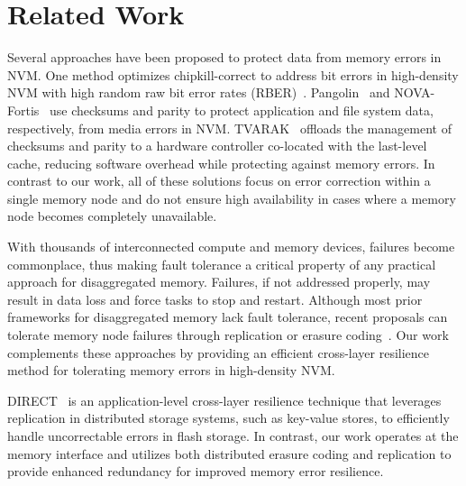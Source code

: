 \section{Related Work}
Several approaches have been proposed to protect data from memory errors in NVM. One method optimizes chipkill-correct to address bit errors in high-density NVM with high random raw bit error rates (RBER)~\cite{zhang:pm-chipkill:micro:2018}. Pangolin~\cite{zhang:pangolin:atc:2019} and NOVA-Fortis~\cite{xu:nova-fortis:sosp:2017} use checksums and parity to protect application and file system data, respectively, from media errors in NVM. TVARAK~\cite{kateja:tvarak:isca:2020} offloads the management of checksums and parity to a hardware controller co-located with the last-level cache, reducing software overhead while protecting against memory errors. In contrast to our work, all of these solutions focus on error correction within a single memory node and do not ensure high availability in cases where a memory node becomes completely unavailable.

With thousands of interconnected compute and memory devices, failures become commonplace, thus making fault tolerance a critical property of any practical approach for disaggregated memory. Failures, if not addressed properly, may result in data loss and force tasks to stop and restart. Although most prior frameworks for disaggregated memory lack fault tolerance, recent proposals can tolerate memory node failures through replication or erasure coding~\cite{zhou:carbink:osdi:2022, lee:hydra:fast:2022}. Our work complements these approaches by providing an efficient cross-layer resilience method for tolerating memory errors in high-density NVM.

DIRECT~\cite{tai:flash-uber:atc:2019} is an application-level cross-layer resilience technique that leverages replication in distributed storage systems, such as key-value stores, to efficiently handle uncorrectable errors in flash storage. 
In contrast, our work operates at the memory interface and utilizes both distributed erasure coding and replication to provide enhanced redundancy for improved memory error resilience.